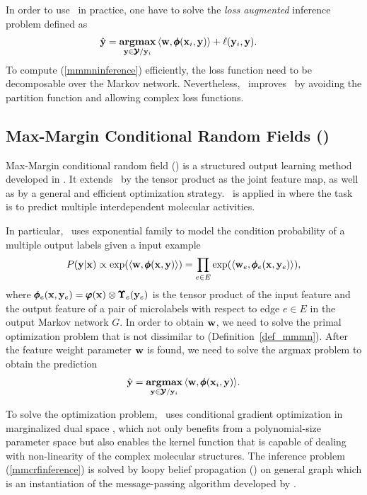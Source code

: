 {In order to use \mmmn\ in practice, one have to solve the \textit{loss augmented} inference problem defined as
\begin{align}
	\hat{\mathbf {y}} = \underset{\mathbf {y}\in\pmb {\mathcal{Y}}/\mathbf {y}_i}{\textbf{argmax}} &\, \langle \mathbf {w}, \pmb \phi(\mathbf {x}_i,\mathbf {y}) \rangle + \mathbf {\ell}(\mathbf {y}_i,\mathbf {y}) \label{mmmninference}.
\end{align} 
To compute (\ref{mmmninference}) efficiently, the loss function need to be decomposable over the Markov network.
Nevertheless, \mmmn\ improves \crf\ by avoiding the partition function and allowing complex loss functions.



%
%
\subsection{Max-Margin Conditional Random Fields (\mmcrf)} \label{sc_mmcrf}

Max-Margin conditional random field (\mmcrf) is a structured output learning method developed in \citep{Rousu07}.
It extends \mmmn\ by the tensor product as the joint feature map, as well as by a general and efficient optimization strategy. 
\mmcrf\ is applied in  where the task is to predict multiple interdependent molecular activities.

In particular, \mmcrf\ uses exponential family to model the condition probability of a multiple output labels given a input example
\begin{align*}
	P(\mathbf {y}|\mathbf {x}) \propto \exp(\langle \mathbf {w}, \pmb \phi(\mathbf {x},\mathbf {y}) \rangle) = \prod_{e\in E}\exp(\langle \mathbf {w}_e, \pmb \phi_e(\mathbf {x},\mathbf {y}_e) \rangle),
\end{align*}
where $\pmb \phi_e(\mathbf {x},\mathbf {y}_e)=\pmb \varphi(\mathbf {x})\otimes\pmb \Upsilon_e(\mathbf {y}_e)$ is the tensor product of the input feature and the output feature of a pair of microlabels with respect to edge $e\in E$ in the output Markov network $G$.
In order to obtain $\mathbf {w}$, we need to solve the primal optimization problem that is not dissimilar to (Definition~\ref{def_mmmn}).
After the feature weight parameter $\mathbf {w}$ is found, we need to solve the argmax problem to obtain the prediction
\begin{align}
	\hat{\mathbf {y}} = \underset{\mathbf {y}\in\pmb {\mathcal{Y}}/\mathbf {y}_i}{\textbf{argmax}} \, \langle \mathbf {w}, \pmb \phi(\mathbf {x}_i,\mathbf {y}) \rangle.\label{mmcrfinference}
\end{align}

To solve the optimization problem, \mmcrf\ uses conditional gradient optimization \citep{Bertsekas95nonlinear} in marginalized dual space \citep{Taskar04max}, which not only benefits from a polynomial-size parameter space but also enables the kernel function that is capable of dealing with non-linearity of the complex molecular structures.
The inference problem (\ref{mmcrfinference}) is solved by loopy belief propagation (\lbp) on general graph which is an instantiation of the message-passing algorithm developed by \cite{Wainwright08graphical}.



}

